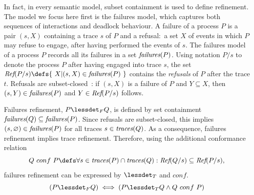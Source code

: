 In fact, in every semantic model, subset containment is used to define refinement. The
model we focus here first is the failures model, which captures both
sequences of interactions and deadlock behaviour. A failure of a process $P$
is a pair $(s,X)$ containing a trace $s$ of $P$ and a refusal:~a set $X$ of
events in which $P$ may refuse to engage, after having performed the events of
$s$. The failures model of a process $P$ records all its failures in a set
$\text{\it failures}(P)$. 
Using notation $P/s$ to denote the process $P$ after having engaged into trace $s$,
the set 
$\refs(P/s) \defs \{~X | (s,X) \in \fails(P)~\}$ contains the \emph{refusals} 
of $P$ after the
trace $t$. 
Refusals are subset-closed~\cite{Hoare:1985:CSP:3921,Roscoe2010}: if $(s,X)$ is a failure of $P$ and $Y\subseteq X$,
then $(s,Y)\in\text{\it failures}(P)$ and $Y\in\text{\it Ref}(P/s)$ follows.

Failures refinement, $P \lessdet_F Q$, is defined by set containment 
$\text{\it failures}(Q)\subseteq\text{\it failures}(P)$. Since refusals are subset-closed, this implies
$(s,\varnothing)\in\text{\it failures}(P)$ for all traces $s\in\text{\it traces}(Q)$. As a consequence, failures 
refinement implies trace refinement. Therefore, using the additional conformance relation
\begin{equation}\label{eq:conf}
  Q\ conf\ P \defs \forall s\in \trc(P) \cap \trc(Q): \refs(Q/s)
  \subseteq \refs(P/s),
\end{equation}
failures refinement can be expressed by $\lessdet_T$ and $conf$.
\begin{equation}\label{thm:fref-tref-conf}
(P \lessdet_F Q) \iff (P \lessdet_T Q \land Q\ conf\ P)
\end{equation}



%
%
%

